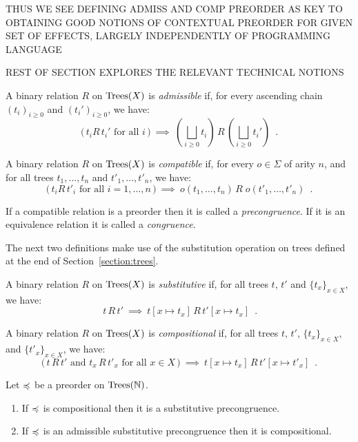 THUS WE SEE DEFINING ADMISS AND COMP PREORDER AS KEY TO OBTAINING GOOD NOTIONS OF CONTEXTUAL PREORDER FOR GIVEN SET OF EFFECTS, LARGELY INDEPENDENTLY OF PROGRAMMING LANGUAGE

REST OF SECTION EXPLORES THE RELEVANT TECHNICAL NOTIONS

\begin{definition}[Admissibility]
    A binary relation $R$ on $\textnormal{Trees}(X)$ is \emph{admissible} if,
    for every ascending chain $(t_i)_{i \geq 0}$ and 
    $(t_i')_{i\geq 0}$, we have:
    \[ \text{($\,t_i  R \, t_i'$ for all $i\,$)} ~ \implies~
        \left(\bigsqcup_{i \geq 0} t_i\right) \, R \, \left(\bigsqcup_{i \geq 0} t_i'\right) \enspace .
    \]
\end{definition}

\begin{definition}[Compatibility]
    A binary relation $R$ on $\textnormal{Trees}(X)$ is  \emph{compatible} if,
    for every $o \in \Sigma$ of arity $n$, and for all trees 
     $t_1,\dots, t_n$ and $t'_1, \dots, t'_n$, we have:
    \[ \text{($\,t_i  R \, t'_i$ for all $i = 1, \dots, n\,$)} ~ \implies ~ 
        o(t_1, \dots, t_n) \, R \; o(t'_1, \dots, t'_n) \enspace .
    \]
\end{definition}
If a compatible relation is a preorder then it is called a \emph{precongruence}. If it is an equivalence relation it is called a \emph{congruence}.

\noindent
The next two definitions make use of the substitution operation on trees defined at the end of
Section~\ref{section:trees}.
\begin{definition}[Substitutive]
    A binary relation $R$ on $\textnormal{Trees}(X)$ is  \emph{substitutive} if,
    for all trees $t$, $t'$ and $\{t_x\}_{x \in X}$, we have:
    \[ \text{$\,t\, R \, t'$} ~ \implies ~ 
       t[ x \mapsto t_x] \, R \, t'[ x \mapsto t_x] \enspace .
    \]
\end{definition}



\begin{definition}[Compositionality]
    A binary relation $R$ on $\textnormal{Trees}(X)$ is \emph{compositional} if, for all 
    trees $t$, $t'$,  $\{t_x\}_{x \in X}$,  and $\{t'_x\}_{x \in X}$, we have:
        \[ \text{($\,t \, R \, t'$ and $t_x \, R \, t'_x$ for all $x \in X\,$)} ~ \implies ~ 
        t[ x \mapsto t_x] \, R \, t'[ x \mapsto t'_x] \enspace .
    \]
\end{definition}



\begin{proposition} Let $\preccurlyeq$ be a preorder  on $\textnormal{Trees}(\mathbb{N})$.
\begin{enumerate} 
\item If  $\preccurlyeq$ is compositional then it is a substitutive precongruence.
\item If $\preccurlyeq$ is an admissible substitutive precongruence then it is compositional.
\end{enumerate}
\end{proposition}

